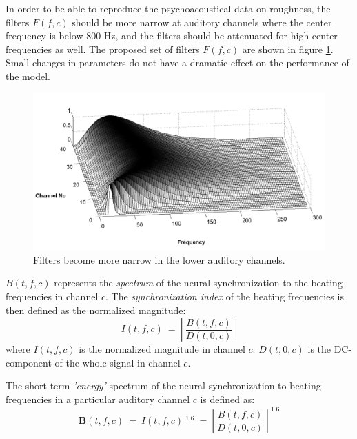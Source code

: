 In order to be able to reproduce the psychoacoustical data on
roughness, the filters $F(f,c)$ should be more narrow at auditory
channels where the center frequency is below 800 Hz, and the
filters should be attenuated for high center frequencies as
well. The proposed set of filters $F(f,c)$ are shown in figure
\ref{Fig:Filters}. Small changes in parameters do not have a
dramatic effect on the performance of the model.

\begin{figure}[ht]
    \centering
    \includegraphics[width=\IPEMDefaultFigureWidth]{Graphics/Filters}
    \caption{Filters become more narrow in the lower auditory channels.}
    \label{Fig:Filters}
\end{figure}



$B(t,f,c)$ represents the \emph{spectrum} of the neural
synchronization to the beating frequencies in channel $c$. The
\emph{synchronization index} of the beating frequencies is then
defined as the normalized magnitude:
\begin{equation}
  I(t,f,c) ~=~ \left |~ \frac{B(t,f,c)}{D(t,0,c)}~\right |
\end{equation}
where $I(t,f,c)$ is the normalized magnitude in channel $c$.
$D(t,0,c)$ is the DC-component of the whole signal in channel
$c$.

The short-term \emph{'energy'} spectrum of the neural
synchronization to beating frequencies in a particular auditory
channel $c$ is defined as:
\begin{equation}\label{Rspectrum}
\textbf{B}(t,f,c) ~=~ I(t,f,c) ~^{1.6}~=~ {\left |~
\frac{B(t,f,c)}{D(t,0,c)}~\right |~}^{1.6}
\end{equation}




